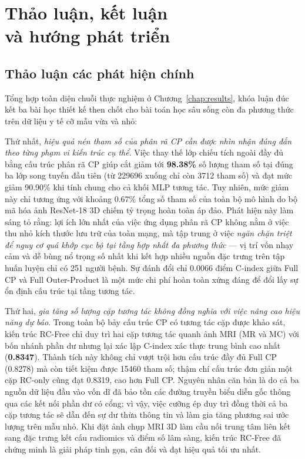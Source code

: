 \chapter[Thảo luận, kết luận và hướng phát triển]{Thảo luận, kết luận\\và hướng phát triển}
\label{chap:discussion}

\section{Thảo luận các phát hiện chính}
Tổng hợp toàn diện chuỗi thực nghiệm ở Chương~\ref{chap:results}, khóa luận đúc kết ba bài học thiết kế then chốt cho bài toán học sâu sống còn đa phương thức trên dữ liệu y tế cỡ mẫu vừa và nhỏ:

Thứ nhất, \emph{hiệu quả nén tham số của phân rã CP cần được nhìn nhận đúng đắn theo từng phạm vi kiến trúc cụ thể}. Việc thay thế lớp chiếu tích ngoài đầy đủ bằng cấu trúc phân rã CP giúp cắt giảm tới \textbf{98.38\%} số lượng tham số tại đúng ba lớp song tuyến đầu tiên (từ 229696 xuống chỉ còn 3712 tham số) và đạt mức giảm 90.90\% khi tính chung cho cả khối MLP tương tác. Tuy nhiên, mức giảm này chỉ tương ứng với khoảng 0.67\% tổng số tham số của toàn bộ mô hình do bộ mã hóa ảnh ResNet-18 3D chiếm tỷ trọng hoàn toàn áp đảo. Phát hiện này làm sáng tỏ rằng: lợi ích lớn nhất của việc ứng dụng phân rã CP không nằm ở việc thu nhỏ kích thước lưu trữ của toàn mạng, mà tập trung ở việc \emph{ngăn chặn triệt để nguy cơ quá khớp cục bộ tại tầng hợp nhất đa phương thức} — vị trí vốn nhạy cảm và dễ bùng nổ trọng số nhất khi kết hợp nhiều nguồn đặc trưng trên tập huấn luyện chỉ có 251 người bệnh. Sự đánh đổi chỉ 0.0066 điểm C-index giữa Full CP và Full Outer-Product là một mức chi phí hoàn toàn xứng đáng để đổi lấy sự ổn định cấu trúc tại tầng tương tác.

Thứ hai, \emph{gia tăng số lượng cặp tương tác không đồng nghĩa với việc nâng cao hiệu năng dự báo}. Trong toàn bộ bảy cấu trúc CP có tương tác cặp được khảo sát, kiến trúc RC-Free chỉ duy trì hai cặp tương tác quanh ảnh MRI (MR và MC) với bốn nhánh phần dư nhưng lại xác lập C-index xác thực trung bình cao nhất (\textbf{0.8347}). Thành tích này không chỉ vượt trội hơn cấu trúc đầy đủ Full CP (0.8278) mà còn tiết kiệm được 15460 tham số; thậm chí cấu trúc đơn giản một cặp RC-only cũng đạt 0.8319, cao hơn Full CP. Nguyên nhân căn bản là do cả ba nguồn dữ liệu đầu vào vốn dĩ đã bảo tồn các đường truyền biểu diễn gốc thông qua các kết nối phần dư có cổng; vì vậy, việc cưỡng ép duy trì đồng thời cả ba cặp tương tác sẽ dẫn đến sự dư thừa thông tin và làm gia tăng phương sai ước lượng trên mẫu nhỏ. Khi đặt ảnh chụp MRI 3D làm cầu nối trung tâm liên kết sang đặc trưng kết cấu radiomics và điểm số lâm sàng, kiến trúc RC-Free đã chứng minh là giải pháp tinh gọn, cân đối và đạt hiệu quả tối ưu nhất.

